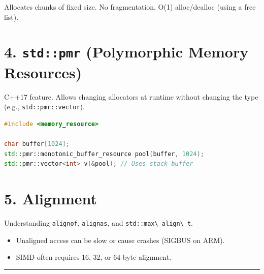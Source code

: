 Allocates chunks of fixed size. No fragmentation. O(1) alloc/dealloc
(using a free list).

\hypertarget{stdpmr-polymorphic-memory-resources}{%
\section{\texorpdfstring{4. \texttt{std::pmr} (Polymorphic Memory
Resources)}{4. std::pmr (Polymorphic Memory Resources)}}\label{stdpmr-polymorphic-memory-resources}}

C++17 feature. Allows changing allocators at runtime without changing
the type (e.g., \passthrough{\lstinline!std::pmr::vector!}).

\begin{lstlisting}[language={C++}]
#include <memory_resource>

char buffer[1024];
std::pmr::monotonic_buffer_resource pool(buffer, 1024);
std::pmr::vector<int> v(&pool); // Uses stack buffer
\end{lstlisting}

\hypertarget{alignment}{%
\section{5. Alignment}\label{alignment}}

Understanding \passthrough{\lstinline!alignof!},
\passthrough{\lstinline!alignas!}, and
\passthrough{\lstinline!std::max\_align\_t!}.

\begin{itemize}
\tightlist
\item
  Unaligned access can be slow or cause crashes (SIGBUS on ARM).
\item
  SIMD often requires 16, 32, or 64-byte alignment.
\end{itemize}

\begin{center}\rule{0.5\linewidth}{0.5pt}\end{center}
